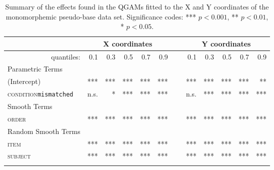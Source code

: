 \begin{table}\fontsize{9}{10}
\caption{Summary of the effects found in the QGAMs fitted to the X and Y coordinates of the monomorphemic pseudo-base data set. Significance codes: *** $p < 0.001$, ** $p < 0.01$, * $p < 0.05$.}
\label{tab:7.11}
\centering
\begin{tabular}{lrrrrrrrrrrr}
\lsptoprule
~                   & \multicolumn{5}{c}{X coordinates}       & \multicolumn{1}{c}{}                       & \multicolumn{5}{c}{Y coordinates}                               \\
\midrule
\multicolumn{1}{r}{quantiles:}          & 0.1        & 0.3        & 0.5        & 0.7        & 0.9 & ~        & 0.1        & 0.3        & 0.5        & 0.7        & 0.9         \\
\midrule
Parametric Terms    & \textbf{~} & \textbf{~} & \textbf{~} & \textbf{~} & \textbf{~} & \textbf{~} & \textbf{~} & \textbf{~} & \textbf{~} & \textbf{~}  \\
\midrule
(Intercept)         & ***        & ***        & ***        & ***        & *** & ~       & ***        & ***        & ***        & ***        & **          \\
\textsc{condition}\texttt{mismatched} & n.s.       & *          & ***        & ***        & ***   & ~     & n.s.       & ***        & ***        & ***        & ***         \\
\midrule
Smooth Terms        & \textbf{~} & \textbf{~} & \textbf{~} & \textbf{~} & \textbf{~} & \textbf{~} & \textbf{~} & \textbf{~} & \textbf{~} & \textbf{~}  \\
\midrule
\textsc{order}               & ***        & ***        & ***        & ***        & ***  & ~      & ***        & ***        & ***        & ***        & ***         \\
\midrule
Random Smooth Terms & \textbf{~} & \textbf{~} & \textbf{~} & \textbf{~} & \textbf{~} & \textbf{~} & \textbf{~} & \textbf{~} & \textbf{~} & \textbf{~}  \\
\midrule
\textsc{item}                & ***        & ***        & ***        & ***        & ***   & ~     & ***        & ***        & ***        & ***        & ***         \\
\textsc{subject}             & ***        & ***        & ***        & ***        & ***   & ~     & ***        & ***        & ***        & ***        & ***        \\
\lspbottomrule
\end{tabular}
\end{table}

